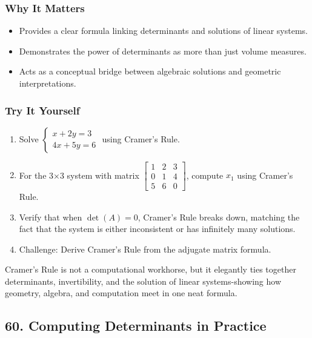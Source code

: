 \documentclass[
  letterpaper,
  DIV=11,
  numbers=noendperiod]{scrreprt}
\providecommand{\tightlist}{%
  \setlength{\itemsep}{0pt}\setlength{\parskip}{0pt}}
\begin{document}
\subsubsection{Why It Matters}\label{why-it-matters-55}

\begin{itemize}
\tightlist
\item
  Provides a clear formula linking determinants and solutions of linear
  systems.
\item
  Demonstrates the power of determinants as more than just volume
  measures.
\item
  Acts as a conceptual bridge between algebraic solutions and geometric
  interpretations.
\end{itemize}

\subsubsection{Try It Yourself}\label{try-it-yourself-58}

\begin{enumerate}
\def\labelenumi{\arabic{enumi}.}
\tightlist
\item
  Solve \(\begin{cases} x + 2y = 3 \\ 4x + 5y = 6 \end{cases}\) using
  Cramer's Rule.
\item
  For the 3×3 system with matrix
  \(\begin{bmatrix} 1 & 2 & 3 \\ 0 & 1 & 4 \\ 5 & 6 & 0 \end{bmatrix}\),
  compute \(x_1\) using Cramer's Rule.
\item
  Verify that when \(\det(A)=0\), Cramer's Rule breaks down, matching
  the fact that the system is either inconsistent or has infinitely many
  solutions.
\item
  Challenge: Derive Cramer's Rule from the adjugate matrix formula.
\end{enumerate}

Cramer's Rule is not a computational workhorse, but it elegantly ties
together determinants, invertibility, and the solution of linear
systems-showing how geometry, algebra, and computation meet in one neat
formula.

\subsection{60. Computing Determinants in
Practice}\label{computing-determinants-in-practice}
\end{document}
